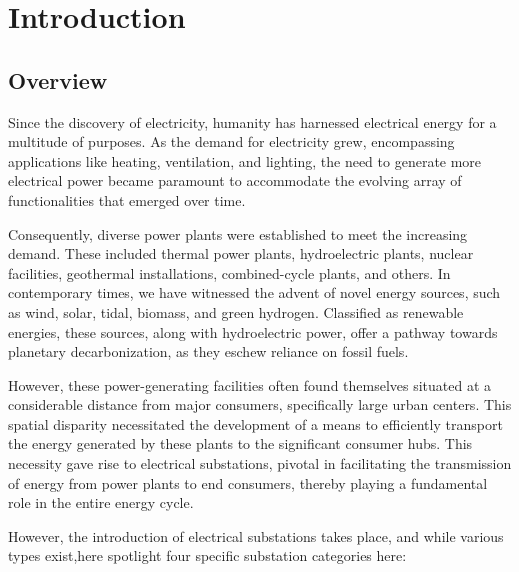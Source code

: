 % 
\chapter{Introduction} %
\label{chap:Chapter1} %


%
\section{Overview}
\label{sec:chap1_guidelines} %
Since the discovery of electricity, humanity has harnessed electrical energy for a multitude of purposes. As the demand for electricity grew, encompassing applications like heating, ventilation, and lighting, the need to generate more electrical power became paramount to accommodate the evolving array of functionalities that emerged over time.

Consequently, diverse power plants were established to meet the increasing demand. These included thermal power plants, hydroelectric plants, nuclear facilities, geothermal installations, combined-cycle plants, and others. In contemporary times, we have witnessed the advent of novel energy sources, such as wind, solar, tidal, biomass, and green hydrogen. Classified as renewable energies, these sources, along with hydroelectric power, offer a pathway towards planetary decarbonization, as they eschew reliance on fossil fuels.

However, these power-generating facilities often found themselves situated at a considerable distance from major consumers, specifically large urban centers. This spatial disparity necessitated the development of a means to efficiently transport the energy generated by these plants to the significant consumer hubs. This necessity gave rise to electrical substations, pivotal in facilitating the transmission of energy from power plants to end consumers, thereby playing a fundamental role in the entire energy cycle.

However, the introduction of electrical substations takes place, and while various types exist,here spotlight four specific substation categories here:

